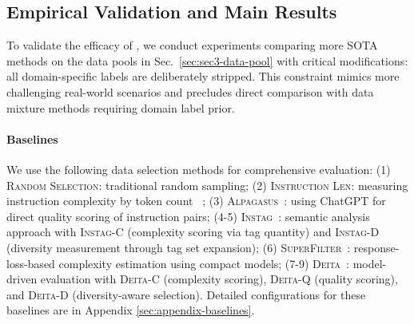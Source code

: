 \subsection{Empirical Validation and Main Results}

To validate the efficacy of \ours, we conduct experiments comparing more SOTA methods on the data pools in Sec.~\ref{sec:sec3-data-pool} with critical modifications: all domain-specific labels are deliberately stripped. This constraint mimics more challenging real-world scenarios and precludes direct comparison with data mixture methods requiring domain label prior. 

\paragraph{Baselines}
We use the following data selection methods for comprehensive evaluation: 
(1) \textsc{Random Selection}: traditional random sampling; 
(2) \textsc{Instruction Len}: measuring instruction complexity by token count ~\cite{cao2023instruction}; 
(3) \textsc{Alpagasus}~\cite{chen2024alpagasus}: using ChatGPT for direct quality scoring of instruction pairs; 
(4-5) \textsc{Instag}~\cite{lu2023instag}: semantic analysis approach with \textsc{Instag-C} (complexity scoring via tag quantity) and \textsc{Instag-D} (diversity measurement through tag set expansion); 
(6) \textsc{SuperFilter}~\cite{li2024super}: response-loss-based complexity estimation using compact models; 
(7-9) \textsc{Deita}~\cite{liu2023deita}: model-driven evaluation with \textsc{Deita-C} (complexity scoring), \textsc{Deita-Q} (quality scoring), and \textsc{Deita-D} (diversity-aware selection). 
Detailed configurations for these baselines are in Appendix \ref{sec:appendix-baselines}.



